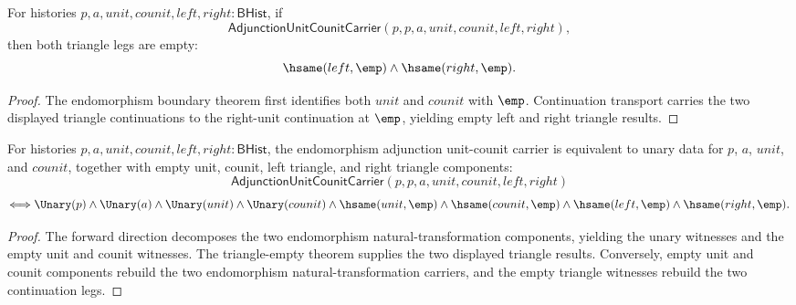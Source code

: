 \begin{theorem}
\label{thm:adjunction-unit-counit-carrier-endomorphism-triangles-empty}
For histories $p,a,unit,counit,left,right:\mathsf{BHist}$, if
$$
\mathsf{AdjunctionUnitCounitCarrier}(p,p,a,unit,counit,left,right),
$$
then both triangle legs are empty:
$$
\hsame(left,\emp)\land\hsame(right,\emp).
$$
\end{theorem}
\begin{proof}
The endomorphism boundary theorem first identifies both $unit$ and $counit$
with $\emp$. Continuation transport carries the two displayed triangle
continuations to the right-unit continuation at $\emp$, yielding empty left and
right triangle results.
\end{proof}

\begin{theorem}
\label{thm:adjunction-unit-counit-carrier-endomorphism-empty-components-iff}
For histories $p,a,unit,counit,left,right:\mathsf{BHist}$, the endomorphism
adjunction unit-counit carrier is equivalent to unary data for $p$, $a$,
$unit$, and $counit$, together with empty unit, counit, left triangle, and
right triangle components:
$$
\mathsf{AdjunctionUnitCounitCarrier}(p,p,a,unit,counit,left,right)
$$
$$
\Longleftrightarrow
\Unary(p)\wedge\Unary(a)\wedge\Unary(unit)\wedge\Unary(counit)
\wedge\hsame(unit,\emp)\wedge\hsame(counit,\emp)
\wedge\hsame(left,\emp)\wedge\hsame(right,\emp).
$$
\end{theorem}
\begin{proof}
The forward direction decomposes the two endomorphism natural-transformation
components, yielding the unary witnesses and the empty unit and counit
witnesses. The triangle-empty theorem supplies the two displayed triangle
results. Conversely, empty unit and counit components rebuild the two
endomorphism natural-transformation carriers, and the empty triangle witnesses
rebuild the two continuation legs.
\end{proof}

